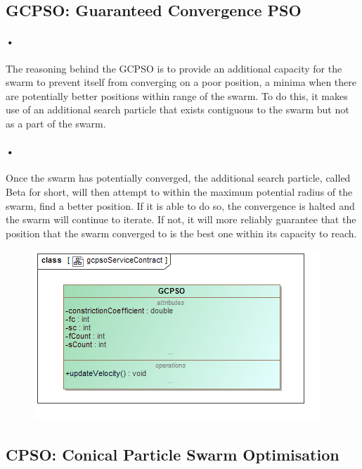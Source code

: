\documentclass[11pt]{article}
\begin{document}
\subsection{GCPSO: Guaranteed Convergence PSO}
\paragraph{•}
The reasoning behind the GCPSO is to provide an additional capacity for the swarm to prevent itself from converging on a poor position, a minima when there are potentially better positions within range of the swarm. To do this, it makes use of an additional search particle that exists contiguous to the swarm but not as a part of the swarm.

\paragraph{•}
Once the swarm has potentially converged, the additional search particle, called Beta for short, will then attempt to within the maximum potential radius of the swarm, find a better position. If it is able to do so, the convergence is halted and the swarm will continue to iterate. If not, it will more reliably guarantee that the position that the swarm converged to is the best one within its capacity to reach.
\begin{figure}[h]
	\includegraphics[scale=0.45]{gcpsoServiceContract.png}
\end{figure}

\subsection{CPSO: Conical Particle Swarm Optimisation}
\end{document}
